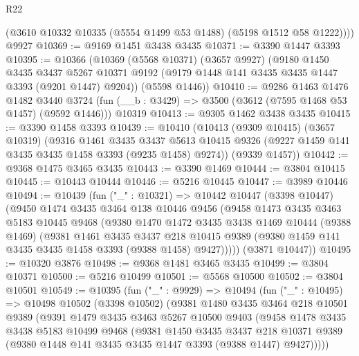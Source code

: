 \begin{lexlean}{R22}
\begin{coremodule}
        (@3610 @10332 @10335 (@5554 @1499 @53 @1488) (@5198 @1512 @58 @1222))))
    @9927
@10369 := @9169 @1451 @3438 @3435
@10371 := @3390 @1447 @3393
@10395 := @10366
    (@10369
      (@5568 @10371)
      (@3657 @9927)
      (@9180
        @1450
        @3435
        @3437
        @5267
        @10371
        @9192
        (@9179 @1448 @141 @3435 @3435 @1447 @3393 (@9201 @1447) @9204))
      (@5598 @1446))
@10410 := @9286
    @1463
    @1476
    @1482
    @3440
    @3724
    (fun (__b : @3429) => @3500 (@3612 (@7595 @1468 @53 @1457) (@9592 @1446)))
    @10319
@10413 := @9305 @1462 @3438 @3435
@10415 := @3390 @1458 @3393
@10439 := @10410
    (@10413
      (@9309 @10415)
      (@3657 @10319)
      (@9316
        @1461
        @3435
        @3437
        @5613
        @10415
        @9326
        (@9227 @1459 @141 @3435 @3435 @1458 @3393 (@9235 @1458) @9274))
      (@9339 @1457))
@10442 := @9368 @1475 @3465 @3435
@10443 := @3390 @1469
@10444 := @3804 @10415
@10445 := @10443 @10444
@10446 := @5216 @10445
@10447 := @3989 @10446
@10494 := @10439
    (fun ("_" : @10321) =>
    @10442
      @10447
      (@3398 @10447)
      (@9450
        @1474
        @3435
        @3464
        @138
        @10446
        @9456
        (@9458
          @1473
          @3435
          @3463
          @5183
          @10445
          @9468
          (@9380
            @1470
            @1472
            @3435
            @3438
            @1469
            @10444
            (@9388 @1469)
            (@9381
              @1461
              @3435
              @3437
              @218
              @10415
              @9389
              (@9380 @1459 @141 @3435 @3435 @1458 @3393 (@9388 @1458) @9427)))))
      (@3871 @10447))
@10495 := @10320 @3876
@10498 := @9368 @1481 @3465 @3435
@10499 := @3804 @10371
@10500 := @5216 @10499
@10501 := @5568 @10500
@10502 := @3804 @10501
@10549 := @10395
    (fun ("_" : @9929) =>
    @10494
      (fun ("_" : @10495) =>
      @10498
        @10502
        (@3398 @10502)
        (@9381
          @1480
          @3435
          @3464
          @218
          @10501
          @9389
          (@9391
            @1479
            @3435
            @3463
            @5267
            @10500
            @9403
            (@9458
              @1478
              @3435
              @3438
              @5183
              @10499
              @9468
              (@9381
                @1450
                @3435
                @3437
                @218
                @10371
                @9389
                (@9380 @1448 @141 @3435 @3435 @1447 @3393 (@9388 @1447) @9427)))))

\end{coremodule}
\end{lexlean}
